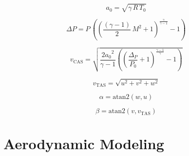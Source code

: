 \documentclass[lettersize,journal]{IEEEtran}
\begin{document}
{\begin{equation}
a_{0}=\sqrt{\gamma\,R\,T_{0}}
\end{equation}

\begin{equation}
\Delta P=P\,\left({\left(\frac{(\gamma-1)}{2}\,M^2+1\right)}^{\frac{\gamma }{\gamma -1}}-1\right)
\end{equation}

\begin{equation}
v_{\mathrm{CAS}}=\sqrt{\frac{{2a_{0}}^2}{\gamma -1}\left({\left(\frac{\Delta _{P}}{P_{0}}+1\right)}^{\frac{\gamma -1}{\gamma }}-1\right)}
\end{equation}

\begin{equation}
v_{\mathrm{TAS}}=\sqrt{u^2+v^2+w^2}
\end{equation}

\begin{equation}
\alpha=\mathrm{atan2}\left(w,u\right)
\end{equation}

\begin{equation}
\beta=\mathrm{atan2}\left(v,v_{\mathrm{TAS}}\right)
\end{equation}

\newpage

\section{Aerodynamic Modeling}\label{apdx:aero}

}
\end{document}
